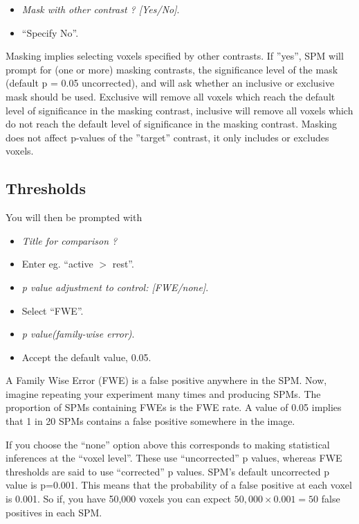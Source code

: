 \begin{itemize}
\item  \emph{Mask with other contrast ? [Yes/No]}.
\item ``Specify No''.
\end{itemize}

Masking implies selecting voxels specified by other contrasts. If ''yes'', SPM will prompt for (one or more) masking contrasts, the significance level of the mask (default p = 0.05 uncorrected), and will ask whether an inclusive or exclusive mask should be used. Exclusive will remove all voxels which reach the default level of significance in the masking contrast, inclusive will remove all voxels which do not reach the default level of significance in the masking contrast. Masking does not affect p-values of the ''target'' contrast, it only includes or excludes voxels.

\subsection{Thresholds}

You will then be prompted with

\begin{itemize}
\item \emph{Title for comparison ?}
\item Enter eg. ``active  $>$ rest''.
\item \emph{p value adjustment to control: [FWE/none]}.
\item Select ``FWE''.
\item \emph{p value(family-wise error)}.
\item Accept the default value, 0.05.
\end{itemize}

A Family Wise Error (FWE) is a false positive anywhere in the SPM. Now, imagine repeating your experiment many times and producing SPMs. The proportion of SPMs containing FWEs is the FWE rate. A value of 0.05 implies that 1 in 20 SPMs contains a false positive somewhere in the image. 

If you choose the ``none'' option above this corresponds to making statistical inferences at the ``voxel level''. These use ``uncorrected'' p values, whereas FWE thresholds are said to use ``corrected'' p values. SPM's default uncorrected p value is p=0.001. This means that the probability of a false positive at each voxel is 0.001. So if, you have 50,000 voxels you can expect $50,000 \times 0.001 = 50$ false positives in each SPM.


